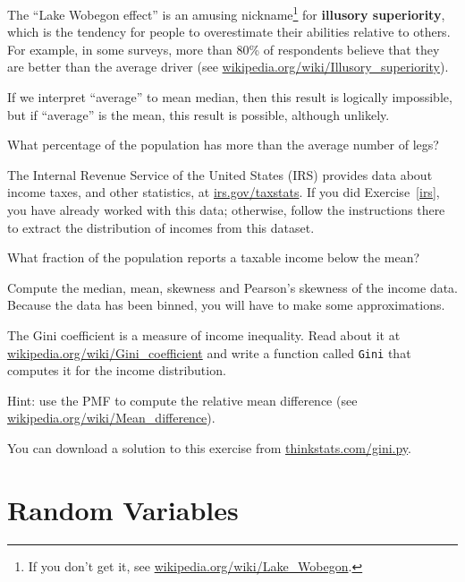\documentclass[12pt]{book}
\begin{document}
\begin{exercise}
The ``Lake Wobegon effect'' is an amusing nickname\footnote{If you
  don't get it, see \url{wikipedia.org/wiki/Lake_Wobegon}.} for {\bf
  illusory superiority}, which is the tendency for people to
overestimate their abilities relative to others.  For example, in some
surveys, more than 80\% of respondents believe that they are better
than the average driver (see
  \url{wikipedia.org/wiki/Illusory_superiority}).

If we interpret ``average'' to mean median, then this result is
logically impossible, but if ``average'' is the mean, this result is
possible, although unlikely.

What percentage of the population has more than the average number
of legs?

\end{exercise}


\begin{exercise}
The Internal Revenue Service of the United States (IRS) provides data
about income taxes, and other statistics, at \url{irs.gov/taxstats}.
If you did Exercise~\ref{irs}, you have already worked with this data;
otherwise, follow the instructions there to extract the distribution
of incomes from this dataset.

What fraction of the population reports a taxable income below the
mean?

Compute the median, mean, skewness and Pearson's skewness of the income
data.  Because the data has been binned, you will have to make
some approximations.

The Gini coefficient is a measure of income inequality.
Read about it at \url{wikipedia.org/wiki/Gini_coefficient} and write a
function called {\tt Gini} that computes it for the income
distribution.

Hint: use the PMF to compute the relative mean difference
(see \url{wikipedia.org/wiki/Mean_difference}).

You can download a solution to this exercise from \url{thinkstats.com/gini.py}.

\end{exercise}


\section{Random Variables}
\end{document}
